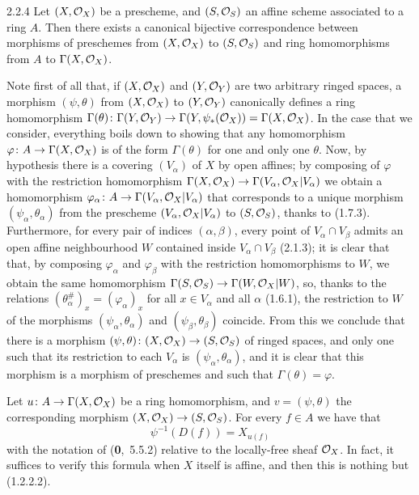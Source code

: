 \documentclass[../main.tex]{subfiles}
\begin{document}
\begin{cx}[Proposition]{2.2.4}
    Let $(X,\mathcal{O}_X)$ be a prescheme, and $(S,\mathcal{O}_S)$ an affine scheme associated to a ring $A$.
    Then there exists a canonical bijective correspondence between morphisms of preschemes from $(X,\mathcal{O}_X)$ to $(S,\mathcal{O}_S)$ and ring homomorphisms from $A$ to $\Gamma(X,\mathcal{O}_X)$.
\end{cx}
Note first of all that, if $(X,\mathcal{O}_X)$ and $(Y,\mathcal{O}_Y)$ are two arbitrary ringed spaces, a morphism $(\psi,\theta)$ from $(X,\mathcal{O}_X)$ to $(Y,\mathcal{O}_Y)$ canonically defines a ring homomorphism $\Gamma(\theta)\colon\Gamma(Y,\mathcal{O}_Y)\to\Gamma(Y,\psi_*(\mathcal{O}_X))=\Gamma(X,\mathcal{O}_X)$.
In the case that we consider, everything boils down to showing that any homomorphism $\varphi\colon A\to\Gamma(X,\mathcal{O}_X)$ is of the form $\Gamma(\theta)$ for one and only one $\theta$.
Now, by hypothesis there is a covering $(V_\alpha)$ of $X$ by open affines; by composing of $\varphi$ with the restriction homomorphism $\Gamma(X,\mathcal{O}_X)\to\Gamma(V_\alpha,\mathcal{O}_X|V_\alpha)$ we obtain a homomorphism $\varphi_\alpha\colon A\to\Gamma(V_\alpha,\mathcal{O}_X|V_\alpha)$ that corresponds to a unique morphism $(\psi_\alpha,\theta_\alpha)$ from the prescheme $(V_\alpha,\mathcal{O}_X|V_\alpha)$ to $(S,\mathcal{O}_S)$, thanks to (1.7.3).
Furthermore, for every pair of indices $(\alpha,\beta)$, every point of $V_\alpha\cap V_\beta$ admits an open affine neighbourhood $W$ contained inside $V_\alpha\cap V_\beta$ (2.1.3); it is clear that that, by composing $\varphi_\alpha$ and $\varphi_\beta$ with the restriction homomorphisms to $W$, we obtain the same homomorphism $\Gamma(S,\mathcal{O}_S)\to\Gamma(W,\mathcal{O}_X|W)$, so, thanks to the relations $(\theta_\alpha^\#)_x=(\varphi_\alpha)_x$ for all $x\in V_\alpha$ and all $\alpha$ (1.6.1), the restriction to $W$ of the morphisms $(\psi_\alpha,\theta_\alpha)$ and $(\psi_\beta,\theta_\beta)$ coincide.
From this we conclude that there is a morphism $(\psi,\theta)\colon(X,\mathcal{O}_X)\to(S,\mathcal{O}_S)$ of ringed spaces, and only one such that its restriction to each $V_\alpha$ is $(\psi_\alpha,\theta_\alpha)$, and it is clear that this morphism is a morphism of preschemes and such that $\Gamma(\theta)=\varphi$.

Let $u\colon A\to\Gamma(X,\mathcal{O}_X)$ be a ring homomorphism, and $v=(\psi,\theta)$ the corresponding morphism $(X,\mathcal{O}_X)\to(S,\mathcal{O}_S)$.
For every $f\in A$ we have that
\begin{equation*}
    \psi^{-1}(D(f))=X_{u(f)}\tag{2.2.4.1}
\end{equation*}
with the notation of (\textbf{0},~5.5.2) relative to the locally-free sheaf $\mathcal{O}_X$.
In fact, it suffices to verify this formula when $X$ itself is affine, and then this is nothing but (1.2.2.2).
\end{document}
